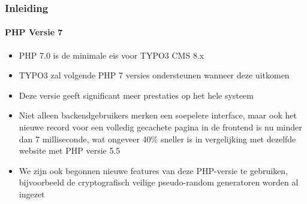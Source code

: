 \begin{frame}[fragile]
	\frametitle{Inleiding}
	\framesubtitle{PHP Versie 7}

	\begin{itemize}

		\item PHP 7.0 is de minimale eis voor TYPO3 CMS 8.x
		\item TYPO3 zal volgende PHP 7 versies ondersteunen wanneer deze uitkomen
		\item Deze versie geeft significant meer prestaties op het hele systeem

		\item Niet alleen backendgebruikers merken een soepelere interface, maar ook het
			nieuwe record voor een volledig gecachete pagina in de frontend is nu minder
			dan 7 milliseconde, wat ongeveer 40\% sneller is in vergelijking met dezelfde
			website met PHP versie 5.5

		\item We zijn ook begonnen nieuwe features van deze PHP-versie te gebruiken, bijvoorbeeld
			de cryptografisch veilige pseudo-random generatoren worden al ingezet

	\end{itemize}

\end{frame}

